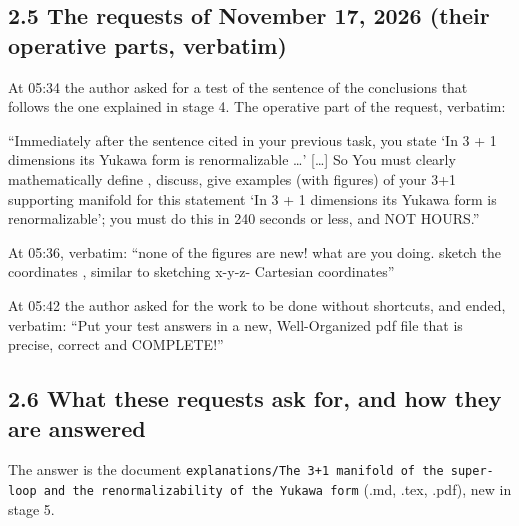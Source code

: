 \documentclass[
  10pt,
]{article}
\begin{document}
\hypertarget{the-requests-of-november-17-2026-their-operative-parts-verbatim}{%
\subsection{2.5 The requests of November 17, 2026 (their operative
parts,
verbatim)}\label{the-requests-of-november-17-2026-their-operative-parts-verbatim}}

At 05:34 the author asked for a test of the sentence of the conclusions
that follows the one explained in stage 4. The operative part of the
request, verbatim:

``Immediately after the sentence cited in your previous task, you state
`In 3 + 1 dimensions its Yukawa form is renormalizable \ldots{}'
{[}\ldots{]} So You must clearly mathematically define , discuss, give
examples (with figures) of your 3+1 supporting manifold for this
statement `In 3 + 1 dimensions its Yukawa form is renormalizable'; you
must do this in 240 seconds or less, and NOT HOURS.''

At 05:36, verbatim: ``none of the figures are new! what are you doing.
sketch the coordinates , similar to sketching x-y-z- Cartesian
coordinates''

At 05:42 the author asked for the work to be done without shortcuts, and
ended, verbatim: ``Put your test answers in a new, Well-Organized pdf
file that is precise, correct and COMPLETE!''

\hypertarget{what-these-requests-ask-for-and-how-they-are-answered}{%
\subsection{2.6 What these requests ask for, and how they are
answered}\label{what-these-requests-ask-for-and-how-they-are-answered}}

The answer is the document
\texttt{explanations/The\ 3+1\ manifold\ of\ the\ super-loop\ and\ the\ renormalizability\ of\ the\ Yukawa\ form}
(.md, .tex, .pdf), new in stage 5.
\end{document}
